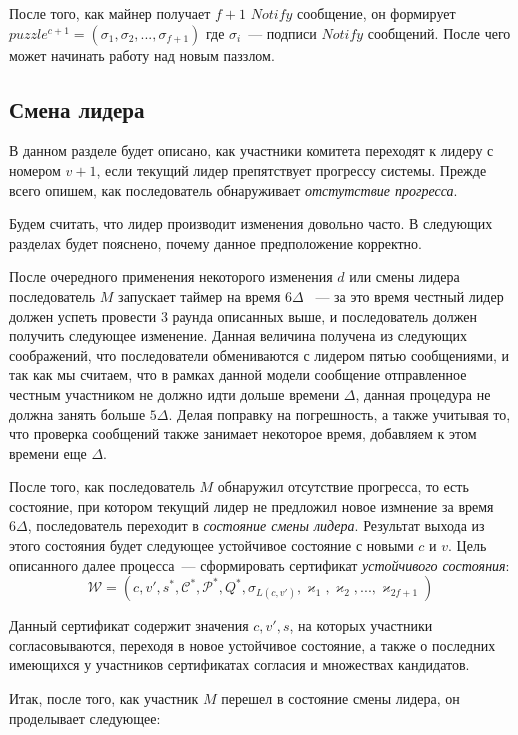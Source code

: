 После того, как майнер получает $f+1$ $Notify$ сообщение, он формирует
$puzzle^{c+1}=(\sigma_1, \sigma_2,..., \sigma_{f+1})$
где $\sigma_i$~--- подписи $Notify$ сообщений. После чего может начинать работу над новым паззлом.

\subsection{Смена лидера} \label{leader-change}
В данном разделе будет описано, как участники комитета переходят к лидеру с номером $v+1$, если текущий лидер препятствует прогрессу системы. Прежде всего опишем, как последователь обнаруживает \textit{отстутствие прогресса}.

Будем считать, что лидер производит изменения довольно часто. В следующих разделах будет пояснено, почему данное предположение корректно.

После очередного применения некоторого изменения $d$ или смены лидера последователь $M$ запускает таймер на время $6\Delta$ ~--- за это время честный лидер должен успеть провести 3 раунда описанных выше, и последователь должен получить следующее изменение.
Данная величина получена из следующих соображений, что последователи обмениваются с лидером пятью сообщениями, и так как мы считаем, что в рамках данной модели сообщение отправленное честным участником не должно идти дольше времени $\Delta$, данная процедура не должна занять больше $5\Delta$. Делая поправку на погрешность, а также учитывая то, что проверка сообщений также занимает некоторое время, добавляем к этом времени еще $\Delta$.

После того, как последователь $M$ обнаружил отсутствие прогресса, то есть состояние, при котором текущий лидер не предложил новое измнение за время $6\Delta$, последователь переходит в \textit{состояние смены лидера}.
Результат выхода из этого состояния будет следующее устойчивое состояние с новыми $c$ и $v$.
Цель описанного далее процесса~--- сформировать сертификат \textit{устойчивого состояния}:
$$\mathcal{W}=(c, v', s^{*}, \mathcal{C}^{*}, \mathcal{P}^{*}, Q^{*}, \sigma_{L(c, v')}, \varkappa_1, \varkappa_2,..., \varkappa_{2f+1})$$

Данный сертификат содержит значения $c, v', s$, на которых участники согласовываются, переходя в новое устойчивое состояние, а также о последних имеющихся у участников сертификатах согласия и множествах кандидатов.

Итак, после того, как участник $M$ перешел в состояние смены лидера, он проделывает следующее:

